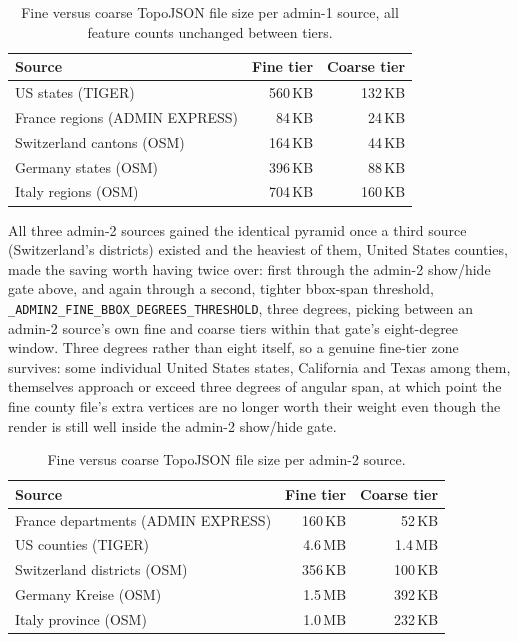 \documentclass[11pt]{article}
\begin{document}
\begin{table}[htbp]
\centering
\small
\begin{tabular}{lrr}
\toprule
Source & Fine tier & Coarse tier \\
\midrule
US states (TIGER) & 560\,KB & 132\,KB \\
France regions (ADMIN EXPRESS) & 84\,KB & 24\,KB \\
Switzerland cantons (OSM) & 164\,KB & 44\,KB \\
Germany states (OSM) & 396\,KB & 88\,KB \\
Italy regions (OSM) & 704\,KB & 160\,KB \\
\bottomrule
\end{tabular}
\caption{Fine versus coarse TopoJSON file size per admin-1 source, all feature counts unchanged between tiers.}
\label{tab:admin1-pyramid}
\end{table}

All three admin-2 sources gained the identical pyramid once a third
source (Switzerland's districts) existed and the heaviest of them,
United States counties, made the saving worth having twice over:
first through the admin-2 show/hide gate above, and again through a
second, tighter bbox-span threshold,
\texttt{\_ADMIN2\_FINE\_BBOX\_DEGREES\_THRESHOLD}, three degrees,
picking between an admin-2 source's own fine and coarse tiers within
that gate's eight-degree window. Three degrees rather than eight
itself, so a genuine fine-tier zone survives: some individual United
States states, California and Texas among them, themselves approach
or exceed three degrees of angular span, at which point the fine
county file's extra vertices are no longer worth their weight even
though the render is still well inside the admin-2 show/hide gate.

\begin{table}[htbp]
\centering
\small
\begin{tabular}{lrr}
\toprule
Source & Fine tier & Coarse tier \\
\midrule
France departments (ADMIN EXPRESS) & 160\,KB & 52\,KB \\
US counties (TIGER) & 4.6\,MB & 1.4\,MB \\
Switzerland districts (OSM) & 356\,KB & 100\,KB \\
Germany Kreise (OSM) & 1.5\,MB & 392\,KB \\
Italy province (OSM) & 1.0\,MB & 232\,KB \\
\bottomrule
\end{tabular}
\caption{Fine versus coarse TopoJSON file size per admin-2 source.}
\label{tab:admin2-pyramid}
\end{table}
\end{document}

